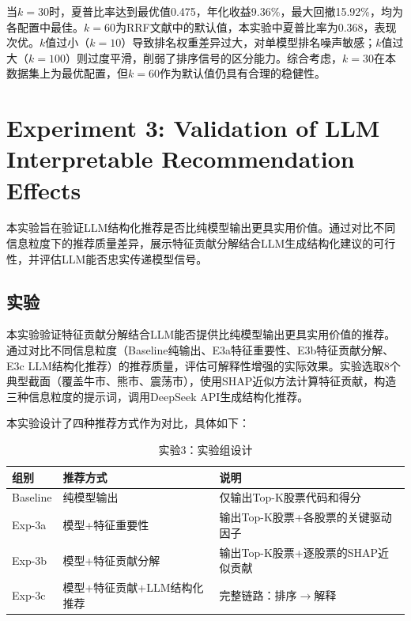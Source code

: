 \documentclass[11pt,a4paper]{ctexart}
\begin{document}
当$k=30$时，夏普比率达到最优值0.475，年化收益9.36\%，最大回撤15.92\%，均为各配置中最佳。$k=60$为RRF文献中的默认值，本实验中夏普比率为0.368，表现次优。$k$值过小（$k=10$）导致排名权重差异过大，对单模型排名噪声敏感；$k$值过大（$k=100$）则过度平滑，削弱了排序信号的区分能力。综合考虑，$k=30$在本数据集上为最优配置，但$k=60$作为默认值仍具有合理的稳健性。

\section{Experiment 3: Validation of LLM Interpretable Recommendation Effects}


本实验旨在验证LLM结构化推荐是否比纯模型输出更具实用价值。通过对比不同信息粒度下的推荐质量差异，展示特征贡献分解结合LLM生成结构化建议的可行性，并评估LLM能否忠实传递模型信号。

\subsection{实验}
本实验验证特征贡献分解结合LLM能否提供比纯模型输出更具实用价值的推荐。通过对比不同信息粒度（Baseline纯输出、E3a特征重要性、E3b特征贡献分解、E3c LLM结构化推荐）的推荐质量，评估可解释性增强的实际效果。实验选取8个典型截面（覆盖牛市、熊市、震荡市），使用SHAP近似方法计算特征贡献，构造三种信息粒度的提示词，调用DeepSeek API生成结构化推荐。

本实验设计了四种推荐方式作为对比，具体如下：

\begin{table}[htbp]
\centering
\caption{实验3：实验组设计}
\label{tab:exp3-groups}
\begin{tabular}{lll}
\toprule
\textbf{组别} & \textbf{推荐方式} & \textbf{说明} \\
\midrule
Baseline & 纯模型输出 & 仅输出Top-K股票代码和得分 \\
Exp-3a   & 模型+特征重要性 & 输出Top-K股票+各股票的关键驱动因子 \\
Exp-3b   & 模型+特征贡献分解 & 输出Top-K股票+逐股票的SHAP近似贡献 \\
Exp-3c   & 模型+特征贡献+LLM结构化推荐 & 完整链路：排序$\to$解释 \\
\bottomrule
\end{tabular}
\end{table}
\end{document}
